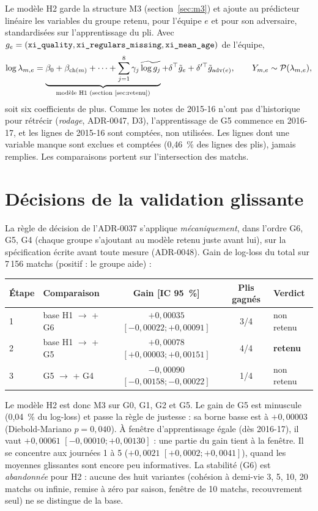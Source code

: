 Le modèle H2 garde la structure M3 (section~\ref{sec:m3}) et ajoute au prédicteur linéaire les variables
du groupe retenu, pour l'équipe \(e\) et pour son adversaire, standardisées sur l'apprentissage du pli. Avec
\(g_e = (\texttt{xi\_quality}, \texttt{xi\_regulars\_missing}, \texttt{xi\_mean\_age})\) de l'équipe,
\[
  \log \lambda_{m,e} = \underbrace{\beta_0 + \beta_{\mathrm{ch}(m)} + \cdots + \sum_{j=1}^{8} \gamma_j\,
  \widetilde{\log g_j}}_{\text{modèle H1 (section~\ref{sec:retenu})}}
  + \delta^\top \tilde g_e + \delta'^\top \tilde g_{\mathrm{adv}(e)},
  \qquad Y_{m,e} \sim \mathcal{P}(\lambda_{m,e}),
\]
soit six coefficients de plus. Comme les notes de 2015-16 n'ont pas d'historique pour rétrécir
(\emph{rodage}, ADR-0047, D3), l'apprentissage de G5 commence en 2016-17, et les lignes de 2015-16 sont
comptées, non utilisées. Les lignes dont une variable manque sont exclues et comptées (0,46~\% des lignes
des plis), jamais remplies. Les comparaisons portent sur l'intersection des matchs.

\section{Décisions de la validation glissante}
\label{sec:h2-decisions}

La règle de décision de l'ADR-0037 s'applique \emph{mécaniquement}, dans l'ordre G6, G5, G4 (chaque
groupe s'ajoutant au modèle retenu juste avant lui), sur la spécification écrite avant toute mesure
(ADR-0048). Gain de log-loss du total sur 7\,156 matchs (positif : le groupe aide) :

\begin{center}
\begin{tabular}{llccl}
\toprule
Étape & Comparaison & Gain [IC 95~\%] & Plis gagnés & Verdict \\
\midrule
1 & base H1 \(\to\) + G6 & \(+0{,}00035\) \([-0{,}00022 ; +0{,}00091]\) & 3/4 & non retenu \\
2 & base H1 \(\to\) + G5 & \(+0{,}00078\) \([+0{,}00003 ; +0{,}00151]\) & 4/4 & \textbf{retenu} \\
3 & G5 \(\to\) + G4 & \(-0{,}00090\) \([-0{,}00158 ; -0{,}00022]\) & 1/4 & non retenu \\
\bottomrule
\end{tabular}
\end{center}

Le modèle H2 est donc M3 sur G0, G1, G2 et G5. Le gain de G5 est minuscule (0,04~\% du log-loss) et passe
la règle de justesse : sa borne basse est à \(+0{,}00003\) (Diebold-Mariano \(p = 0{,}040\)). À fenêtre
d'apprentissage égale (dès 2016-17), il vaut \(+0{,}00061\) \([-0{,}00010 ; +0{,}00130]\) : une partie du gain
tient à la fenêtre. Il se concentre aux journées 1 à 5 (\(+0{,}0021\) \([+0{,}0002 ; +0{,}0041]\)), quand les
moyennes glissantes sont encore peu informatives. La stabilité (G6) est \emph{abandonnée} pour H2 : aucune
des huit variantes (cohésion à demi-vie 3, 5, 10, 20 matchs ou infinie, remise à zéro par saison, fenêtre de
10 matchs, recouvrement seul) ne se distingue de la base.

